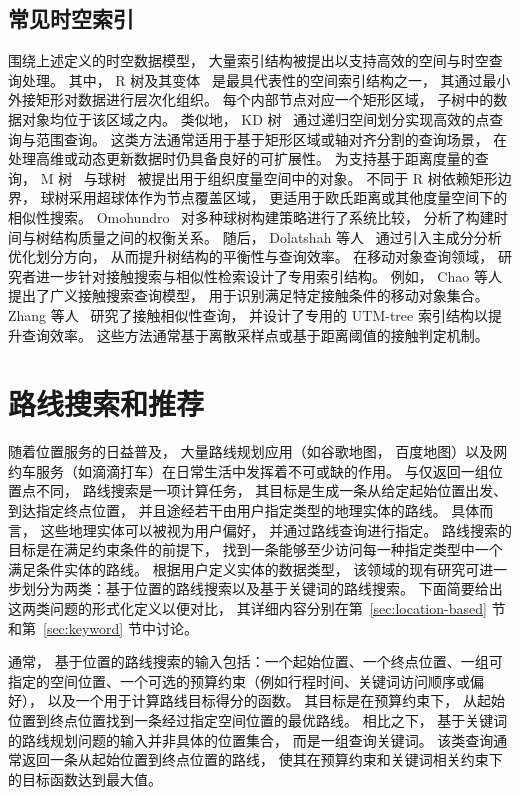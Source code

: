 \subsection{常见时空索引}
围绕上述定义的时空数据模型， 大量索引结构被提出以支持高效的空间与时空查询处理。 其中，
R 树及其变体~ 是最具代表性的空间索引结构之一， 其通过最小外接矩形对数据进行层次化组织。 每个内部节点对应一个矩形区域， 子树中的数据对象均位于该区域之内。 类似地， KD 树~ 通过递归空间划分实现高效的点查询与范围查询。 这类方法通常适用于基于矩形区域或轴对齐分割的查询场景， 在处理高维或动态更新数据时仍具备良好的可扩展性。 为支持基于距离度量的查询， M 树~ 与球树~ 被提出用于组织度量空间中的对象。 不同于 R 树依赖矩形边界， 球树采用超球体作为节点覆盖区域， 更适用于欧氏距离或其他度量空间下的相似性搜索。 Omohundro~ 对多种球树构建策略进行了系统比较， 分析了构建时间与树结构质量之间的权衡关系。 随后， Dolatshah 等人~ 通过引入主成分分析优化划分方向， 从而提升树结构的平衡性与查询效率。 在移动对象查询领域， 研究者进一步针对接触搜索与相似性检索设计了专用索引结构。 例如， Chao 等人~ 提出了广义接触搜索查询模型， 用于识别满足特定接触条件的移动对象集合。 Zhang 等人~ 研究了接触相似性查询， 并设计了专用的 UTM-tree 索引结构以提升查询效率。 这些方法通常基于离散采样点或基于距离阈值的接触判定机制。




\section{路线搜索和推荐}
随着位置服务的日益普及， 大量路线规划应用（如谷歌地图， 百度地图）以及网约车服务（如滴滴打车）在日常生活中发挥着不可或缺的作用。 与仅返回一组位置点不同， 路线搜索是一项计算任务， 其目标是生成一条从给定起始位置出发、到达指定终点位置， 并且途经若干由用户指定类型的地理实体的路线。
具体而言， 这些地理实体可以被视为用户偏好， 并通过路线查询进行指定。 路线搜索的目标是在满足约束条件的前提下， 找到一条能够至少访问每一种指定类型中一个满足条件实体的路线。 根据用户定义实体的数据类型， 该领域的现有研究可进一步划分为两类：基于位置的路线搜索以及基于关键词的路线搜索。 下面简要给出这两类问题的形式化定义以便对比， 其详细内容分别在第~\ref{sec:location-based} 节和第~\ref{sec:keyword} 节中讨论。

通常， 基于位置的路线搜索的输入包括：一个起始位置、一个终点位置、一组可指定的空间位置、一个可选的预算约束（例如行程时间、关键词访问顺序或偏好）， 以及一个用于计算路线目标得分的函数。 其目标是在预算约束下， 从起始位置到终点位置找到一条经过指定空间位置的最优路线。 相比之下， 基于关键词的路线规划问题的输入并非具体的位置集合， 而是一组查询关键词。 该类查询通常返回一条从起始位置到终点位置的路线， 使其在预算约束和关键词相关约束下的目标函数达到最大值。

